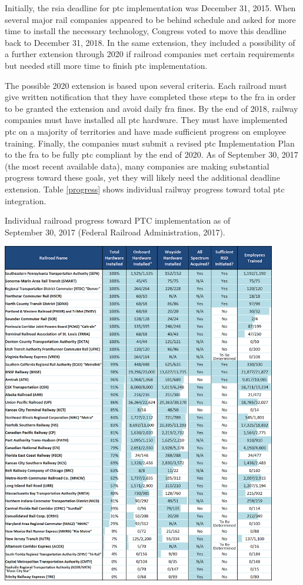 \documentclass[11pt, titlepage]{article}
\begin{document}
Initially, the \gls{rsia} deadline for \gls{ptc} implementation was December 31,
2015. When several major rail companies appeared to be behind schedule and asked
for more time to install the necessary technology, Congress voted to move this
deadline back to December 31, 2018. In the same extension, they included a
possibility of a further extension through 2020 if railroad companies met certain
requirements but needed still more time to finish \gls{ptc} implementation.

The possible 2020 extension is based upon several criteria. Each railroad must
give written notification that they have completed these steps to the \gls{fra}
in order to be granted the extension and avoid daily \gls{fra} fines. By the end
of 2018, railway companies must have installed all \gls{ptc} hardware. They must
have implemented \gls{ptc} on a majority of territories and have made sufficient
progress on employee training. Finally, the companies must submit a revised
\gls{ptc} Implementation Plan to the \gls{fra} to be fully \gls{ptc} compliant by
the end of 2020. As of September 30, 2017 (the most recent available data), many
companies are making substantial progress toward these goals, yet they will likely
need the additional deadline extension. Table \ref{progress} shows individual
railway progress toward total \gls{ptc} integration.

\begin{table}[ht]
    \begin{center}
        \captionsetup{justification=centering}
        \caption{Individual railroad progress toward PTC implementation as of\\
        September 30, 2017 (Federal Railroad Administration, 2017).}
        \includegraphics[width=0.9\textwidth]{RailroadProgressTable.png}
        \label{progress}
    \end{center}
\end{table}
\end{document}

